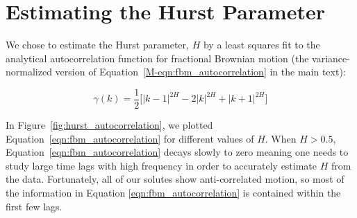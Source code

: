 \documentclass{article}
\begin{document}

  
  \newpage
  
  \section{Estimating the Hurst Parameter}\label{section:H_estimate}
  
  We chose to estimate the Hurst parameter, $H$ by a least squares fit to the analytical
  autocorrelation function for fractional Brownian motion (the variance-normalized version 
  of Equation~\ref{M-eqn:fbm_autocorrelation} in the main text):
  
  \begin{equation}
    \gamma(k) = \dfrac{1}{2}\bigg[|k-1|^{2H} - 2|k|^{2H} + |k+1|^{2H}\bigg]
  \label{eqn:fbm_autocorrelation}
  \end{equation}  
  
  In Figure~\ref{fig:hurst_autocorrelation}, we plotted Equation~\ref{eqn:fbm_autocorrelation}
  for different values of $H$. When $H > 0.5$, Equation~\ref{eqn:fbm_autocorrelation} decays
  slowly to zero meaning one needs to study large time lags with high frequency in order to
  accurately estimate $H$ from the data. Fortunately, all of our solutes show anti-correlated
  motion, so most of the information in Equation \ref{eqn:fbm_autocorrelation} is contained
  within the first few lags. 
\end{document}
